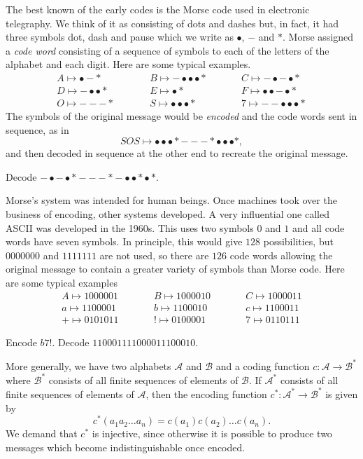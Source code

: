 The best known of the early codes is the Morse code
used in electronic telegraphy.
We think of it as consisting of dots and 
dashes but, in fact, it had three symbols dot, dash and pause
which we write as $\bullet$, $-$ and $*$.
Morse assigned a \emph{code word} consisting of a 
sequence of symbols to each of the letters of the alphabet
and each digit. Here are some typical examples.
\begin{align*}
A\mapsto \bullet-*\qquad
&&B\mapsto -\bullet\bullet\bullet*\qquad
&&C\mapsto-\bullet-\bullet*\\
D\mapsto -\bullet\bullet*\qquad
&&E\mapsto \bullet*\qquad
&&F\mapsto\bullet\bullet-\bullet*\\
O\mapsto ---*\qquad
&&S\mapsto\bullet\bullet\bullet*\qquad
&&7\mapsto--\bullet\bullet\bullet*
\end{align*}
The symbols of the original message would be \emph{encoded}
and the code words sent in sequence, as in
\[SOS\mapsto
\bullet\bullet\bullet*---*\bullet\bullet\bullet*,\]
and then decoded in sequence at the other end
to recreate the original message.
\begin{exercise}\label{E;Morse}
Decode
$-\bullet-\bullet*---*-\bullet\bullet* \bullet*$.
\end{exercise}

Morse's system was intended for human beings.
Once machines took over the business of encoding, 
other systems developed. A very influential
one called ASCII was developed in the 1960s.
This uses two symbols $0$ and $1$
and all code words have seven symbols.
In principle, this would give $128$ possibilities, but $0000000$
and $1111111$ are not used, so there are $126$ code words
allowing the original message to contain a greater
variety of symbols than Morse code. 
Here are some typical examples
\begin{align*}
A\mapsto 1000001\qquad
&&B\mapsto 1000010\qquad
&&C\mapsto 1000011\\
a\mapsto 1100001\qquad
&&b\mapsto 1100010 \qquad
&&c\mapsto 1100011\\
+\mapsto 0101011\qquad
&&!\mapsto 0100001\qquad
&&7\mapsto 0110111
\end{align*}
\begin{exercise}\label{E;ASCII} 
Encode $b7!$. Decode $110001111000011100010$.
\end{exercise}

More generally, we have two alphabets ${\mathcal A}$
and ${\mathcal B}$ 
and a coding function $c:{\mathcal A}\rightarrow{\mathcal B}^{*}$
where ${\mathcal B}^{*}$ consists of all finite sequences of 
elements of  ${\mathcal B}$.
If  ${\mathcal A}^{*}$ consists of all finite sequences 
of elements of  ${\mathcal A}$,
then the encoding function 
$c^{*}:{\mathcal A}^{*}\rightarrow{\mathcal B}^{*}$
is given by
\[c^{*}(a_{1}a_{2}\ldots a_{n})=c(a_{1})c(a_{2})\dots c(a_{n}).\]
We demand that $c^{*}$ is injective, since otherwise
it is possible to produce two
messages which become indistinguishable once encoded.

